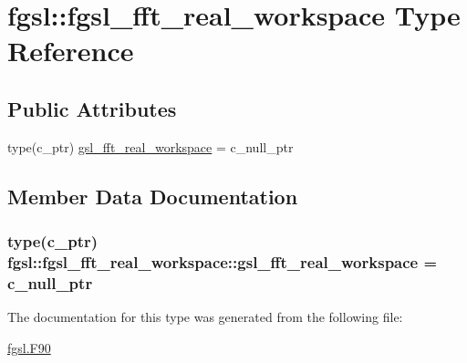 \hypertarget{structfgsl_1_1fgsl__fft__real__workspace}{\section{fgsl\-:\-:fgsl\-\_\-fft\-\_\-real\-\_\-workspace Type Reference}
\label{structfgsl_1_1fgsl__fft__real__workspace}
}
\subsection*{Public Attributes}
\begin{DoxyCompactItemize}
\item 
type(c\-\_\-ptr) \hyperlink{structfgsl_1_1fgsl__fft__real__workspace_aa9c3c1e2241ef0309eca81a637960ec4}{gsl\-\_\-fft\-\_\-real\-\_\-workspace} = c\-\_\-null\-\_\-ptr
\end{DoxyCompactItemize}


\subsection{Member Data Documentation}
\hypertarget{structfgsl_1_1fgsl__fft__real__workspace_aa9c3c1e2241ef0309eca81a637960ec4}{
\subsubsection[{gsl\-\_\-fft\-\_\-real\-\_\-workspace}]{\setlength{\rightskip}{0pt plus 5cm}type(c\-\_\-ptr) fgsl\-::fgsl\-\_\-fft\-\_\-real\-\_\-workspace\-::gsl\-\_\-fft\-\_\-real\-\_\-workspace = c\-\_\-null\-\_\-ptr}}\label{structfgsl_1_1fgsl__fft__real__workspace_aa9c3c1e2241ef0309eca81a637960ec4}


The documentation for this type was generated from the following file\-:\begin{DoxyCompactItemize}
\item 
\hyperlink{fgsl_8F90}{fgsl.\-F90}\end{DoxyCompactItemize}
